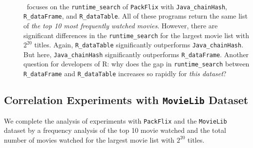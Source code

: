 \begin{description}
\item[]~\\\
focuses on the {\tt runtime\_search} of {\tt PackFlix} with 
{\tt Java\_chainHash},
{\tt R\_dataFrame}, and 
{\tt R\_dataTable}. 
All of these programs return the same list of 
{\it the top 10 most frequently watched movies}.
However, there are significant differences 
in the {\tt runtime\_search} %
for the largest movie list with $2^{20}$ titles.
Again, {\tt R\_dataTable} significantly outperforms
{\tt Java\_chainHash}. But here, {\tt Java\_chainHash}
significantly outperforms {\tt R\_dataFrame}.
Another question for developers of R:
why does the gap in {\tt runtime\_search} between {\tt R\_dataFrame}
and {\tt R\_dataTable} increases so rapidly 
for {\em this dataset}?


\end{description}

\subsection{Correlation Experiments with {\tt MovieLib} Dataset}
\noindent
%
We complete the analysis of experiments with {\tt PackFlix} and 
the {\tt MovieLib} dataset by a frequency analysis of the 
top 10 movie watched and the total number of movies watched 
for the largest movie list with $2^{20}$ titles.

